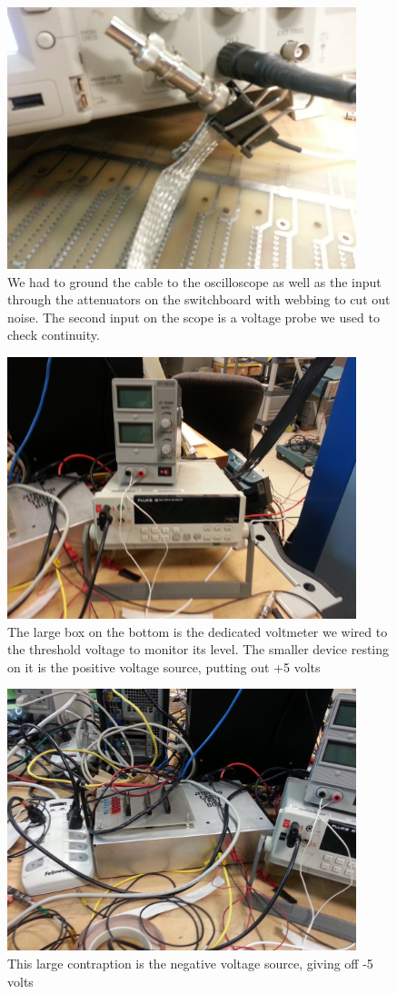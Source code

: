 \documentclass[final]{report}
\begin{document}
\begin{figure}[6]
  \centering
  \includegraphics[height=3in]{Figure6.jpg}
  \caption{We had to ground the cable to the oscilloscope as well as the input through the attenuators on the switchboard with webbing to cut out noise. The second input on the scope is a voltage probe we used to check continuity.}
  \label{fig:grounding}
\end{figure}
\begin{figure}[7]
  \centering
  \includegraphics[height=3in]{Figure7.jpg}
  \caption{The large box on the bottom is the dedicated voltmeter we wired to the threshold voltage to monitor its level. The smaller device resting on it is the positive voltage source, putting out +5 volts}
  \label{fig:voltmeter}
\end{figure}
\begin{figure}[8]
  \centering
  \includegraphics[height=3in]{Figure8.jpg}
  \caption{This large contraption is the negative voltage source, giving off -5 volts}
  \label{fig:negative}
\end{figure}
\end{document}
